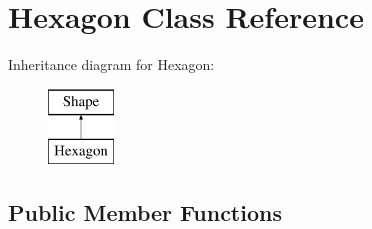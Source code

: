 \hypertarget{class_hexagon}{}\section{Hexagon Class Reference}
\label{class_hexagon}
Inheritance diagram for Hexagon\+:\begin{figure}[H]
\begin{center}
\leavevmode
\includegraphics[height=2.000000cm]{class_hexagon}
\end{center}
\end{figure}
\subsection*{Public Member Functions}
